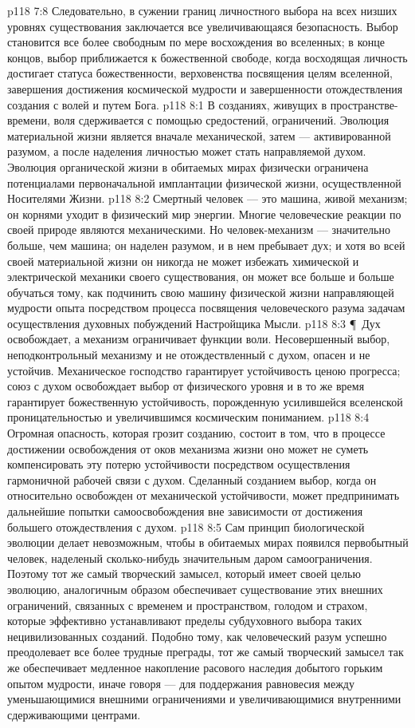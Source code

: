\vs p118 7:8 Следовательно, в сужении границ личностного выбора на всех низших уровнях существования заключается все увеличивающаяся безопасность. Выбор становится все более свободным по мере восхождения во вселенных; в конце концов, выбор приближается к божественной свободе, когда восходящая личность достигает статуса божественности, верховенства посвящения целям вселенной, завершения достижения космической мудрости и завершенности отождествления создания с волей и путем Бога.
\vs p118 8:1 В созданиях, живущих в пространстве\hyp{}времени, воля сдерживается с помощью средостений, ограничений. Эволюция материальной жизни является вначале механической, затем --- активированной разумом, а после наделения личностью может стать направляемой духом. Эволюция органической жизни в обитаемых мирах физически ограничена потенциалами первоначальной имплантации физической жизни, осуществленной Носителями Жизни.
\vs p118 8:2 Смертный человек --- это машина, живой механизм; он корнями уходит в физический мир энергии. Многие человеческие реакции по своей природе являются механическими. Но человек\hyp{}механизм --- значительно больше, чем машина; он наделен разумом, и в нем пребывает дух; и хотя во всей своей материальной жизни он никогда не может избежать химической и электрической механики своего существования, он может все больше и больше обучаться тому, как подчинить свою машину физической жизни направляющей мудрости опыта посредством процесса посвящения человеческого разума задачам осуществления духовных побуждений Настройщика Мысли.
\vs p118 8:3 \P\ Дух освобождает, а механизм ограничивает функции воли. Несовершенный выбор, неподконтрольный механизму и не отождествленный с духом, опасен и не устойчив. Механическое господство гарантирует устойчивость ценою прогресса; союз с духом освобождает выбор от физического уровня и в то же время гарантирует божественную устойчивость, порожденную усилившейся вселенской проницательностью и увеличившимся космическим пониманием.
\vs p118 8:4 Огромная опасность, которая грозит созданию, состоит в том, что в процессе достижении освобождения от оков механизма жизни оно может не суметь компенсировать эту потерю устойчивости посредством осуществления гармоничной рабочей связи с духом. Сделанный созданием выбор, когда он относительно освобожден от механической устойчивости, может предпринимать дальнейшие попытки самоосвобождения вне зависимости от достижения большего отождествления с духом.
\vs p118 8:5 Сам принцип биологической эволюции делает невозможным, чтобы в обитаемых мирах появился первобытный человек, наделеный сколько\hyp{}нибудь значительным даром самоограничения. Поэтому тот же самый творческий замысел, который имеет своей целью эволюцию, аналогичным образом обеспечивает существование этих внешних ограничений, связанных с временем и пространством, голодом и страхом, которые эффективно устанавливают пределы субдуховного выбора таких нецивилизованных созданий. Подобно тому, как человеческий разум успешно преодолевает все более трудные преграды, тот же самый творческий замысел так же обеспечивает медленное накопление расового наследия добытого горьким опытом мудрости, иначе говоря --- для поддержания равновесия между уменьшающимися внешними ограничениями и увеличивающимися внутренними сдерживающими центрами.
